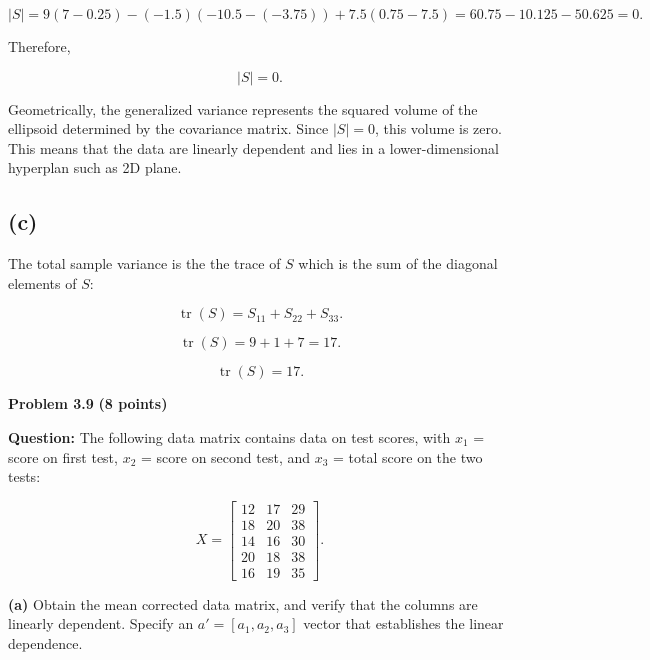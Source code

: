 \documentclass{article}
\begin{document}
$$
|S|= 9(7 - 0.25) - (-1.5)(-10.5 - (-3.75)) + 7.5(0.75 - 7.5) = 60.75 - 10.125 - 50.625 = 0.
$$

Therefore,

$$
\boxed{|S|=0}.
$$

Geometrically, the generalized variance represents the squared
volume of the ellipsoid determined by the covariance matrix.
Since $|S|=0$, this volume is zero. This means that the data are linearly dependent and lies in a lower-dimensional hyperplan such as 2D plane.


\subsection*{(c)}

The total sample variance is the the trace of $S$ which is the sum of the diagonal elements of
$S$:

$$
\operatorname{tr}(S)
=
S_{11}+S_{22}+S_{33}.
$$

$$
\operatorname{tr}(S)
=
9+1+7
=
17.
$$

$$
\boxed{\operatorname{tr}(S)=17}.
$$


\newpage

\noindent
{\Large \textbf{Problem 3.9}}
\hfill
{\large \textbf{(8 points)}}

\vspace{0.3cm}

\noindent
\textbf{Question:} The following data matrix contains data on test
scores, with $x_1$ = score on first test, $x_2$ = score on second test,
and $x_3$ = total score on the two tests:

$$
X=
\begin{bmatrix}
12&17&29\\
18&20&38\\
14&16&30\\
20&18&38\\
16&19&35
\end{bmatrix}.
$$

\vspace{0.2cm}

\noindent
\textbf{(a)} Obtain the mean corrected data matrix, and verify that the
columns are linearly dependent. Specify an $a'=[a_1,a_2,a_3]$ vector
that establishes the linear dependence.
\end{document}

